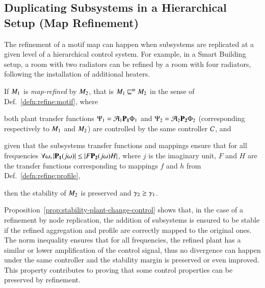 \documentclass[runningheads]{llncs}
\newenvironment{textlist}{\begin{enumerate*}[label=(\emph{\roman*})]}{\end{enumerate*}}
\newcommand{\defn}[1]{Def.~\ref{defn:#1}}
\newcommand{\Prop}[1]{Proposition~\ref{prop:#1}}
\newcommand{\abstracts}[1][]{\sqsubseteq\ifx#1\relax\else^{#1}\fi}
\newcommand{\isrefinedby}{\abstracts}
\newcommand{\motif}[1][]{M\ifx#1\relax\else^{#1}\fi}
\newcommand{\profile}[1][]{\Phi\ifx#1\relax\else^{#1}\fi}
\newcommand{\aggregation}[1][]{\mathcal{A}\ifx#1\relax\else^{#1}\fi}
\newcommand{\plant}[1][]{\Psi\ifx#1\relax\else^{#1}\fi}
\newcommand{\subplant}[1][]{P\ifx#1\relax\else^{#1}\fi}
\newcommand{\controller}[1][]{\mathcal{C}\ifx#1\relax\else^{#1}\fi}
\newcommand{\margin}[1][]{\gamma\ifx#1\relax\else^{#1}\fi}
\begin{document}
\subsection{Duplicating Subsystems in a Hierarchical Setup (Map Refinement)}

The refinement of a motif map can happen when subsystems are replicated at a given level of a hierarchical control system. For example, in a Smart Building setup, a room with two radiators can be refined by a room with four radiators, following the installation of additional heaters.

\begin{proposition}
\label{prop:stability-plant-change-control}
If $\motif_1$ is \emph{map-refined} by $\motif_2$, 
that is $\motif_1 \isrefinedby[m] \motif_2$ in the sense of \defn{refine:motif}, where
\begin{textlist}
    \item  both plant transfer functions $\plant_1 = \aggregation_1 \mathbf{\subplant_1} \profile_1$ and $\plant_2 = \aggregation_2 \mathbf{\subplant_2} \profile_2$ (corresponding 
respectively to $\motif_1$ and $\motif_2$)
are controlled by the same controller \( \controller \),
and
\item
given that the subsystems transfer functions and mappings ensure that 
for all frequencies
\( \forall \omega, |\mathbf{\subplant_1}(j \omega)| \leq | F \mathbf{\subplant_2}(j \omega) H  |\),
where $j$ is the imaginary unit, $F$ and $H$ are the transfer functions corresponding to 
mappings $f$ and $h$ from \defn{refine:profile},
\end{textlist}
then the stability of $\motif_2$ is preserved and \(\margin_2 \geq \margin_1\). 
\end{proposition}

\Prop{stability-plant-change-control} shows that, in the case of a refinement by node replication, the addition of subsystems is ensured to be stable if the refined aggregation and profile are correctly mapped to the original ones. 
The norm inequality ensures that for all frequencies, the refined plant 
has a similar or lower amplification of the control signal, thus no divergence can happen under the same controller and the stability margin is preserved or even improved.
This property contributes to proving that some control properties can be preserved by refinement.
\end{document}
